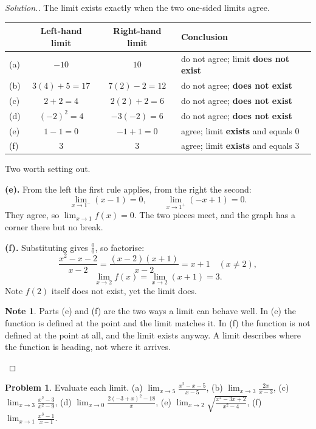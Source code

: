 \documentclass[11pt,a4paper]{article}
\theoremstyle{definition}
\newtheorem{note}[thm]{Note}
\newtheorem{problemx}{Problem}[section]
\newenvironment{problem}{\begin{problemx}}{\end{problemx}}
\newenvironment{solution}
  {\renewcommand{\qedsymbol}{}\begin{proof}[\textit{Solution}.]}
  {\end{proof}}
\begin{document}
\begin{solution}
The limit exists exactly when the two one-sided limits agree.

\begin{table}[H]
\centering
\begin{tabular}{|l|c|c|l|}
\hline
 & Left-hand limit & Right-hand limit & Conclusion\\
\hline
(a) & $-10$ & $10$ & do not agree; limit \textbf{does not exist}\\
(b) & $3(4)+5=17$ & $7(2)-2=12$ & do not agree; \textbf{does not exist}\\
(c) & $2+2=4$ & $2(2)+2=6$ & do not agree; \textbf{does not exist}\\
(d) & $(-2)^2=4$ & $-3(-2)=6$ & do not agree; \textbf{does not exist}\\
(e) & $1-1=0$ & $-1+1=0$ & agree; limit \textbf{exists} and equals $0$\\
(f) & $3$ & $3$ & agree; limit \textbf{exists} and equals $3$\\
\hline
\end{tabular}
\end{table}

Two worth setting out.

\textbf{(e).} From the left the first rule applies, from the right the second:
$$\lim_{x\to 1^-}(x-1)=0,\qquad \lim_{x\to 1^+}(-x+1)=0.$$
They agree, so $\lim_{x\to 1}f(x)=0$. The two pieces meet, and the graph has a corner
there but no break.

\textbf{(f).} Substituting gives $\frac{0}{0}$, so factorise:
$$\frac{x^2-x-2}{x-2}=\frac{(x-2)(x+1)}{x-2}=x+1\quad (x\neq 2),$$
$$\lim_{x\to 2}f(x)=\lim_{x\to 2}(x+1)=3.$$
Note $f(2)$ itself does not exist, yet the limit does.

\begin{note}
Parts (e) and (f) are the two ways a limit can behave well. In (e) the function is
defined at the point and the limit matches it. In (f) the function is not defined at the
point at all, and the limit exists anyway. A limit describes where the function is
heading, not where it arrives.
\end{note}
\end{solution}

\begin{problem}
Evaluate each limit.
\quad (a) $\lim_{x\to 5}\frac{x^2-x-5}{x-5}$, \quad (b) $\lim_{x\to 3}\frac{2x}{x-3}$,
\quad (c) $\lim_{x\to 3}\frac{x^2-3}{x^2-9}$, \quad
(d) $\lim_{x\to 0}\frac{2(-3+x)^2-18}{x}$, \quad
(e) $\lim_{x\to 2}\sqrt{\frac{x^2-3x+2}{x^2-4}}$, \quad
(f) $\lim_{x\to 1}\frac{x^3-1}{x-1}$.
\end{problem}
\end{document}
